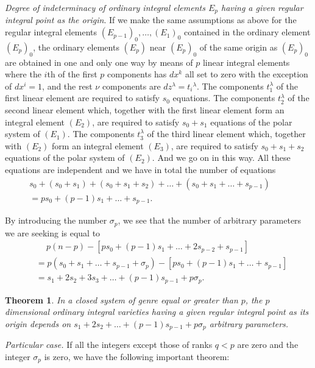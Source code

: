 \documentclass[leqno,11pt]{book}
\numberwithin{equation}{chapter}
\theoremstyle{shape1}
\newtheorem*{thm*}{\hspace{15pt}Theorem}
\theoremstyle{shape0}
\theoremstyle{shape2}
\theoremstyle{definition}
\begin{document}
\vspace{12pt}\fsec \emph{Degree of indeterminacy of ordinary integral elements $E_{p}$ having a given regular integral point as the origin}. If we make the same assumptions as above for the regular integral elements $(E_{p-1})_{0},\dots,(E_{1})_{0}$ contained in the ordinary element $(E_{p})_{0}$, the ordinary elements $(E_{p})$ near $(E_{p})_{0}$ of the same origin as $(E_{p})_{0}$ are obtained in one and only one way by means of $p$ linear integral elements where the $i$th of the first $p$ components has $dx^{k}$ all set to zero with the exception of $dx^{i}=1$, and the rest $\nu$ components are $dz^{\lambda}=t_{i}{}^{\lambda}$. The components $t_{1}^{\lambda}$ of the first linear element are required to satisfy  $s_{0}$ equations. The components $t_{2}^{\lambda}$ of the second linear element which, together with the first linear element form an integral element $(E_{2})$, are required to satisfy $s_{0}+s_{1}$ equations of the polar system of $(E_{1})$. The components $t_{3}^{\lambda}$ of the third linear element which, together with $(E_{2})$ form an integral element $(E_{3})$, are required to satisfy $s_{0}+s_{1}+s_{2}$ equations of the polar system of $(E_{2})$. And we go on in this way. All these equations are independent and we have in total the number of equations
\begin{align*}
s_{0}+(s_{0}+s_{1})+(s_{0}+s_{1}+s_{2})+\dots+(s_{0}+s_{1}+\dots+s_{p-1})\qquad\\
=ps_{0}+(p-1)s_{1}+\dots+s_{p-1}.
\end{align*}

By introducing the number $\sigma_{p}$, we see that the number of arbitrary parameters we are seeking is equal to
\begin{align*}
 &\quad\  p(n-p)-[ps_{0}+(p-1)s_{1}+\dots+2s_{p-2}+s_{p-1}]\\
&=p(s_{0}+s_{1}+\dots+s_{p-1}+\sigma_{p})-[ps_{0}+(p-1)s_{1}+\dots+s_{p-1}]\\
&=s_{1}+2s_{2}+3s_{3}+\dots+(p-1)s_{p-1}+p\sigma_{p}.
\end{align*}

\begin{thm*}
  In a closed system of genre equal or greater than $p$, the $p$ dimensional ordinary integral varieties having a given regular integral point as its origin depends on $s_{1}+2s_{2}+\dots+(p-1)s_{p-1}+p\sigma_{p}$ arbitrary parameters.
\end{thm*}


\vspace{12pt}\fsec \emph{Particular case.} If all the integers except those of ranks $q<p$ are zero and the integer $\sigma_{p}$ is zero, we have the following important theorem:
\end{document}
